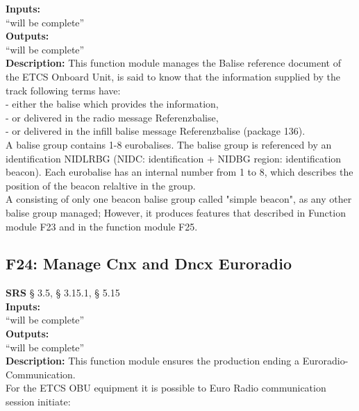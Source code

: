 \documentclass{template/openetcs_report}
\begin{document}
   \textbf{Inputs:}\\
``will be complete''\\

 \textbf{Outputs:}\\
 ``will be complete''\\
 
\textbf{Description:} 
This function module manages the Balise reference document of the ETCS Onboard Unit, 
is said to know that the information supplied by the track following terms have: \\

- either the balise which provides the information, \\

- or delivered in the radio message Referenzbalise, \\

- or delivered in the infill balise message Referenzbalise (package 136). \\

A balise group contains 1-8 eurobalises. 
The balise group is referenced by an identification NIDLRBG (NIDC: identification 
+ NIDBG region: identification beacon). Each eurobalise has an internal number from 1 to 8, 
which describes the position of the beacon relaltive in the group. \\

A consisting of only one beacon balise group called "simple beacon", as 
any other balise group managed; However, it produces features that described in
Function module F23 and in the function module F25.\\

\subsection{F24: Manage Cnx and Dncx Euroradio}
\textbf{SRS} § 3.5, § 3.15.1, § 5.15\\

 \textbf{Inputs:}\\
``will be complete''\\

 \textbf{Outputs:}\\
 ``will be complete''\\
 
\textbf{Description:} 
This function module ensures the production ending a Euroradio- 
Communication. \\
For the ETCS OBU equipment it is possible to Euro Radio communication session
initiate: \\
\end{document}
